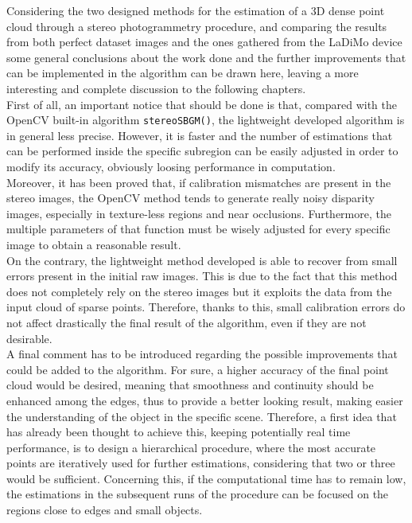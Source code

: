 Considering the two designed methods for the estimation of a 3D dense point cloud through a stereo photogrammetry procedure, and comparing the results from both perfect dataset images and the ones gathered from the LaDiMo device some general conclusions about the work done and the further improvements that can be implemented in the algorithm can be drawn here, leaving a more interesting and complete discussion to the following chapters.\\
First of all, an important notice that should be done is that, compared with the OpenCV built-in algorithm \texttt{stereoSBGM()}, the lightweight developed algorithm is in general less precise.
However, it is faster and the number of estimations that can be performed inside the specific subregion can be easily adjusted in order to modify its accuracy, obviously loosing performance in computation.\\
Moreover, it has been proved that, if calibration mismatches are present in the stereo images, the OpenCV method tends to generate really noisy disparity images, especially in texture-less regions and near occlusions.
Furthermore, the multiple parameters of that function must be wisely adjusted for every specific image to obtain a reasonable result.\\
On the contrary, the lightweight method developed is able to recover from small errors present in the initial raw images. 
This is due to the fact that this method does not completely rely on the stereo images but it exploits the data from the input cloud of sparse points.
Therefore, thanks to this, small calibration errors do not affect drastically the final result of the algorithm, even if they are not desirable. \\
A final comment has to be introduced regarding the possible improvements that could be added to the algorithm.
For sure, a higher accuracy of the final point cloud would be desired, meaning that smoothness and continuity should be enhanced among the edges, thus to provide a better looking result, making easier the understanding of the object in the specific scene.
Therefore, a first idea that has already been thought to achieve this, keeping potentially real time performance, is to design a hierarchical procedure, where the most accurate points are iteratively used for further estimations, considering that two or three would be sufficient.
Concerning this, if the computational time has to remain low, the estimations in the subsequent runs of the procedure can be focused on the regions close to edges and small objects.
